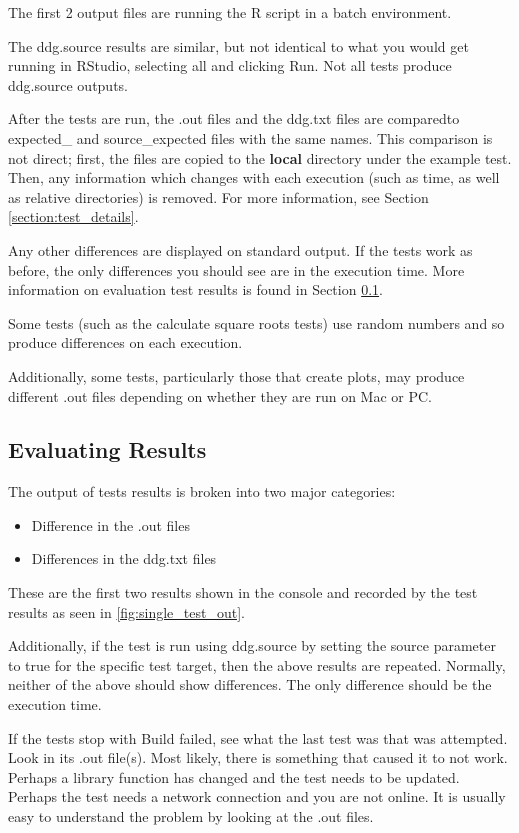 \documentclass[12pt]{article}
\begin{document}
The first 2 output files are running the R script in a batch environment.

The ddg.source results are similar, but not identical to what you would get running in RStudio, selecting all and clicking Run.  Not all tests produce ddg.source outputs.

After the tests are run, the .out files and the ddg.txt files are comparedto expected\_ and source\_expected files with the same names. This comparison is not direct; first, the files are copied to the \textbf{local} directory under the example test. Then, any information which changes with each execution (such as time, as well as relative directories) is removed. For more information, see Section \ref{section:test_details}.

Any other  differences are displayed on standard output.  If the tests work as before, the only  differences you should see are in the execution time. More information on evaluation test results is found in Section \ref{section:evaluate_results}.

Some tests (such as the calculate square roots tests) use random numbers and so produce differences on each execution.  

Additionally, some tests, particularly those that create plots, may produce different 
.out files depending on whether they are run on Mac or PC.

\subsection{Evaluating Results}
\label{section:evaluate_results}
The output of tests results is broken into two major categories:
\begin{itemize}
\item Difference in the .out files
\item Differences in the ddg.txt files
\end{itemize}
These are the first two results shown in the console and recorded by the test results as seen in \ref{fig:single_test_out}. 

Additionally, if the test is run using ddg.source by setting the source parameter to true for the specific test target, then the above results are repeated. Normally, neither of the above should show differences. The only difference should be the execution time.

If the tests stop with Build failed, see what the last test was that was attempted.
Look in its .out file(s).  Most likely, there is something that caused it to 
not work.  Perhaps a library function has changed and the test needs to be
updated.  Perhaps the test needs a network connection and you are not online.
It is usually easy to understand the problem by looking at the .out files.
\end{document}
